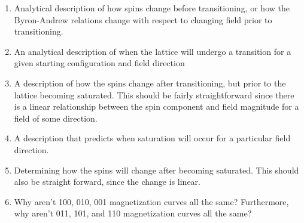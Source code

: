 \documentclass{article}
\begin{document}
 \begin{enumerate}
  \item Analytical description of how spins change before transitioning, or how the Byron-Andrew relations change with 
  respect to changing field prior to transitioning.
  \item An analytical description of when the lattice will undergo a transition for a given starting configuration and field direction
  \item A description of how the spins change after transitioning, but prior to the lattice becoming saturated. This should
  be fairly straightforward since there is a linear relationship between the spin component and field magnitude for a field of some direction.
  \item A description that predicts when saturation will occur for a particular field direction.
  \item Determining how the spins will change after becoming saturated. This should also be straight forward, since the change is
  linear.
  \item Why aren't 100, 010, 001 magnetization curves all the same? Furthermore, why aren't 011, 101, and 110 magnetization curves all the same?
 \end{enumerate}

 
 
\end{document}
